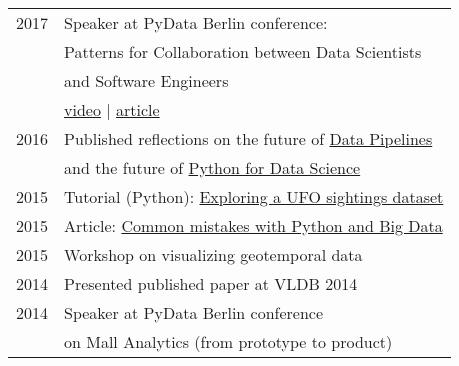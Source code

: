 \documentclass[9pt]{article} %
\begin{document}
\begin{minipage}[t]{0.44\textwidth}
\begin{tabular}{rl}
\textsc{2017}
& Speaker at PyData Berlin conference:\\
& Patterns for Collaboration between Data Scientists\\
& and Software Engineers \\
& \href{https://www.youtube.com/watch?v=7oxC7cbRYyE}{video} | \href{https://www.codementor.io/blog/data-scientists-collab-5ah55wy1ro}{article} \\
\textsc{2016}
& Published reflections on the future of \href{http://www.datasciencecentral.com/profiles/blogs/interview-with-karolina-alexiou-building-data-pipelines}{Data Pipelines}\\
& and the future of \href{https://blog.propulsionacademy.com/why-python-for-data-science-is-the-future-b556de75c80c#.mdh3ztapq}{Python for Data Science}\\
\textsc{2015}
    & Tutorial (Python): \href{https://www.airpair.com/python/posts/using-python-and-qgis-for-geospatial-visualization}{Exploring a UFO sightings dataset}\\
\textsc{2015}
& Article: \href{https://www.airpair.com/python/posts/top-mistakes-python-big-data-analytics}{Common mistakes with Python and Big Data}\\
\textsc{2015}
& Workshop on visualizing geotemporal data\\
\textsc{2014}
& Presented published paper at VLDB 2014\\
\textsc{2014}
& Speaker at PyData Berlin conference \\
& on Mall Analytics (from prototype to product) \\ 





\end{tabular}\\[10pt]

	
\end{minipage} %
\end{document}

